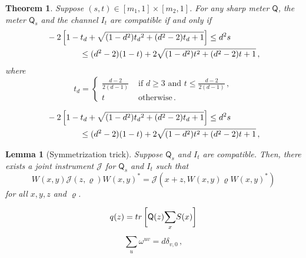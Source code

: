 \documentclass[10pt,a4paper]{amsart}
\newtheorem{theorem}{Theorem}
\newtheorem{lemma}{Lemma}
\newcommand{\Qo}{\mathsf{Q}}%
\newcommand{\ii}{\mathcal{J}}
\newcommand{\rhoo}{\varrho} %
\newcommand{\tr}[1]{{\rm tr}\left[#1\right]} %
\begin{document}
\begin{theorem}\label{thm:main_neg}
Suppose $(s,t)\in [m_1,1]\times [m_2,1]$. For any sharp meter $\Qo$, the meter $\Qo_s$ and the channel $I_t$ are compatible if and only if
\begin{equation}\label{eq:QI_comp_neg}
\begin{aligned}
& - 2\left[1 - t_d + \sqrt{(1 - d^2) \smash[b]{t_d}^2 + (d^2 - 2) \smash[b]{t_d} + 1}\right] \leq d^2 s \\
& \qquad\qquad \leq (d^2 - 2) (1 - t) + 2\sqrt{(1 - d^2) t^2 + (d^2 - 2) t + 1} \,,
\end{aligned}
\end{equation}
where
\begin{equation} %
t_d = \begin{cases}
\displaystyle \frac{d - 2}{2(d - 1)} & \displaystyle \text{ if } d \geq 3 \text{ and } t\leq\frac{d - 2}{2(d - 1)}\,, \\[0.3cm]
t & \text{ otherwise}\,.
\end{cases}
\end{equation}
\end{theorem}

\begin{equation}
\begin{aligned}
& - 2\left[1 - t_d + \sqrt{(1 - d^2) \smash[b]{t_d}^2 + (d^2 - 2) \smash[b]{t_d} + 1}\right] \leq d^2 s \\
& \qquad\qquad \leq (d^2 - 2) (1 - t) + 2\sqrt{(1 - d^2) t^2 + (d^2 - 2) t + 1} \,,
\end{aligned}
\end{equation}

\begin{lemma}[Symmetrization trick]\label{lem:trick}
Suppose $\Qo_s$ and $I_t$ are compatible. Then, there exists a joint instrument $\ii$ for $\Qo_s$ and $I_t$ such that
\begin{equation}\label{eq:Icov_def}
W(x,y)\ii(z,\rhoo)W(x,y)^* = \ii(x+z,W(x,y)\rhoo W(x,y)^*)
\end{equation}
for all $x,y,z$ and $\rhoo$.
\end{lemma}

\begin{equation}\label{eq:q}
q(z) = \tr{\vphantom{\bigg[}\Qo(z)\smash{\sum_x} S(x)}
\end{equation}

\begin{equation}\label{eq:ort_rel}
\sum_u \omega^{uv} = d\delta_{v,0}\,,
\end{equation}
\end{document}
